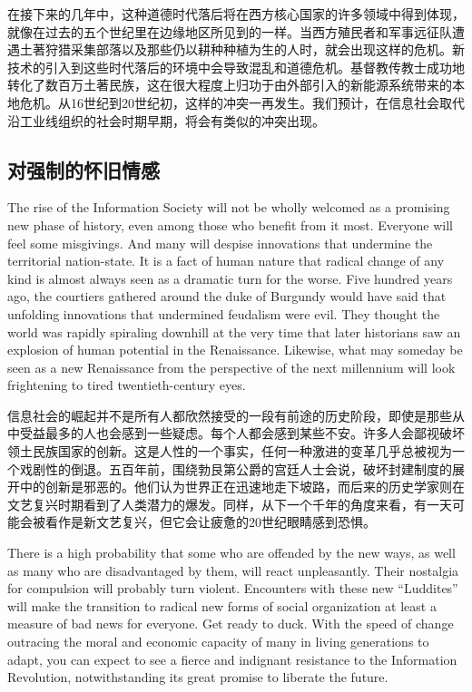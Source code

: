 \begin{Parallel}{97mm}{45mm}
  \ParallelRText
  {\small 在接下来的几年中，这种道德时代落后将在西方核心国家的许多领域中得到体现，就像在过去的五个世纪里在边缘地区所见到的一样。当西方殖民者和军事远征队遭遇土著狩猎采集部落以及那些仍以耕种种植为生的人时，就会出现这样的危机。新技术的引入到这些时代落后的环境中会导致混乱和道德危机。基督教传教士成功地转化了数百万土著民族，这在很大程度上归功于由外部引入的新能源系统带来的本地危机。从16世纪到20世纪初，这样的冲突一再发生。我们预计，在信息社会取代沿工业线组织的社会时期早期，将会有类似的冲突出现。 }
  \ParallelPar

\subsection{对强制的怀旧情感}

  \ParallelLText
  {The rise of the Information Society will not be wholly welcomed as a promising new phase of history, even among those who benefit from it most. Everyone will feel some misgivings. And many will despise innovations that undermine the territorial nation-state. It is a fact of human nature that radical change of any kind is almost always seen as a dramatic turn for the worse. Five hundred years ago, the courtiers gathered around the duke of Burgundy would have said that unfolding innovations that undermined feudalism were evil. They thought the world was rapidly spiraling downhill at the very time that later historians saw an explosion of human potential in the Renaissance. Likewise, what may someday be seen as a new Renaissance from the perspective of the next millennium will look frightening to tired twentieth-century eyes. }
  
  \ParallelRText
  {\small 信息社会的崛起并不是所有人都欣然接受的一段有前途的历史阶段，即使是那些从中受益最多的人也会感到一些疑虑。每个人都会感到某些不安。许多人会鄙视破坏领土民族国家的创新。这是人性的一个事实，任何一种激进的变革几乎总被视为一个戏剧性的倒退。五百年前，围绕勃艮第公爵的宫廷人士会说，破坏封建制度的展开中的创新是邪恶的。他们认为世界正在迅速地走下坡路，而后来的历史学家则在文艺复兴时期看到了人类潜力的爆发。同样，从下一个千年的角度来看，有一天可能会被看作是新文艺复兴，但它会让疲惫的20世纪眼睛感到恐惧。 }
\ParallelPar  

  \ParallelLText
  {There is a high probability that some who are offended by the new ways, as well as many who are disadvantaged by them, will react unpleasantly. Their nostalgia for compulsion will probably turn violent. Encounters with these new “Luddites” will make the transition to radical new forms of social organization at least a measure of bad news for everyone. Get ready to duck. With the speed of change outracing the moral and economic capacity of many in living generations to adapt, you can expect to see a fierce and indignant resistance to the Information Revolution, notwithstanding its great promise to liberate the future. 
  }
  

\end{Parallel}
